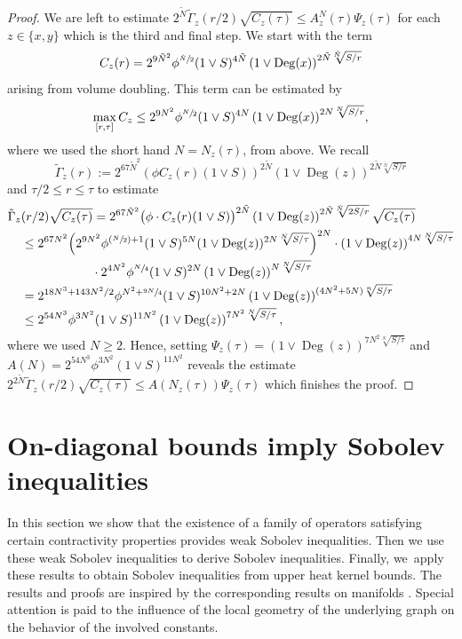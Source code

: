 \documentclass[JEP,XML,SOM,Unicode,published]{cedram}
\newcommand{\Psfrac}[2]{(\sfrac{#1}{#2})}
\theoremstyle{plain}
\theoremstyle{definition}
\DeclareMathOperator{\Deg}{Deg}
\begin{document}
\begin{proof}
We are left to estimate $ 2^{{\tilde N} }\tilde \Gamma_{z}(r/2) \sqrt{C_{z}(\tau)}\leq A^{N}_{z}(\tau)\Psi_{z}(\tau) $ for each $ z\in \{x,y\} $ which is the third and final step.
We start with the term
\[
C_z(r)=2^{9 \tilde N^2}\phi^{\sfrac{\tilde N}{2}}(1\vee S)^{4\tilde N}\left(1\vee\Deg(x)\right)^{2\tilde N\sqrt[\tilde N]{S/r}}
\]
arising from volume doubling. This term can be estimated by
\begin{align*}
\max_{[r,\tau]}C_{z} \leq {2^{9 N^2}\phi^{\sfrac{N}{2}}(1\vee S)^{4N}\left(1\vee\Deg(x)\right)^{2N\sqrt[N]{S/r}}},
\end{align*}
where we used the short hand $ N=N_{z}(\tau) $, from above. We
recall
\[
\tilde\Gamma_z(r)
:=
2^{67\tilde N^2}(\phi C_{z}(r)(1\vee S))^{2\tilde N}
\left(1\vee\Deg(z)
\right)
^{2\tilde N\sqrt[\tilde N]{{S}/{r}}}
\]
and $\tau/2\leq r\leq \tau$ to estimate
\begin{align*}
\tilde \Gamma_{z}&(r/2)\sqrt{C_{z}(\tau)}
=2^{67\tilde N^2}\big(\phi\cdot C_{z}(r)(1\vee S)\big)^{2\tilde N}
\left(1\vee\Deg(z)\right)^{2\tilde N\sqrt[\tilde N]{2{S}/{r}}} \sqrt{C_{z}(\tau)}
\\
&\leq 2^{67 N^2}\Bigl(2^{9 N^2} \phi^{\Psfrac{N}{2}+1}(1\vee S)^{5N}(1\vee\Deg(z))^{2N\sqrt[N]{S/\tau}} \Bigr)^{2 N}
\cdot\left(1\vee\Deg(z)\right)^{4N\sqrt[ N]{{S}/\tau}}
\\ &\hspace*{2cm} \cdot 2^{4 N^2}\phi^{\sfrac N4}(1\vee S)^{2N}\left(1\vee\Deg(z)\right)^{N\sqrt[N]{S/\tau}}
\\
&=
2^{18N^3+143 N^2/2}\phi^{N^{2}+\sfrac{9N}{4}} (1\vee S)^{10N^2+2N} \left(1\vee \Deg(z)\right)^{(4N^2+5N)\sqrt[n]{S/r}}\\
& \leq 2^{54 N^{3}}\phi^{3N^{2}}(1\vee S)^{11N^2}\left(1\vee \Deg(z)
\right)^{7N^2\sqrt[N]{S/\tau}},
\end{align*}
where we used $ N\ge 2 $. Hence, setting $ \Psi_z(\tau)=\left(1\vee \Deg(z)
\right)^{7N^2\sqrt[N]{S/\tau}}$
and $ A(N)=2^{54N^3}\phi
^{3N^2}(1\vee {S})^{11N^2} $
reveals the estimate {$ 2^{2{\tilde N}}\tilde \Gamma_{z}(r/2)\sqrt{C_{z}(\tau)} \leq A(N_{z}(\tau))\Psi_{z}(\tau)$} which finishes the proof.
\end{proof}

\section{On-diagonal bounds imply Sobolev inequalities}\label{section:heatsob}

{In this section} we show that the existence of a family of operators satisfying certain contractivity properties provides weak Sobolev inequalities. Then we use these weak Sobolev inequalities to derive Sobolev inequalities. Finally, we~apply these results to obtain Sobolev inequalities from upper heat kernel bounds. The results and proofs are inspired by the corresponding results on manifolds \cite{SaloffC-01,Varopoulos-85}. Special attention is paid to the influence of the local geometry of the underlying graph on the behavior of the involved constants.
\end{document}
